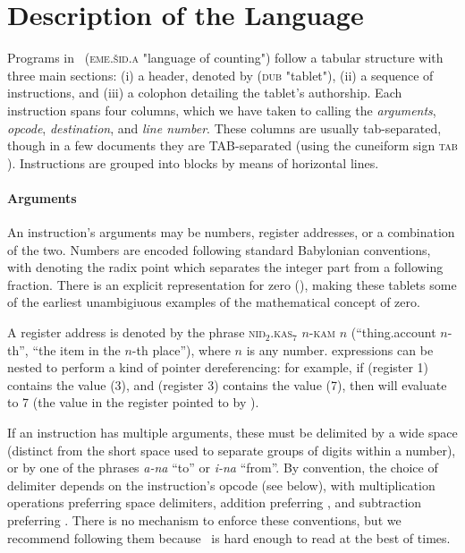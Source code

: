 \documentclass[11pt]{article}
\newcommand{\emeszida}{\textcuneiform{𒅴𒋃𒀀}}
\begin{document}
\section{Description of the Language}
Programs in \emeszida\ (\textsc{eme.šid.a} "language of counting") follow a tabular structure with three main sections: (i) a header, denoted by  (\textsc{dub}  "tablet"), (ii) a sequence of instructions, and (iii) a colophon detailing the tablet's authorship.
Each instruction spans four columns, which we have taken to calling the \textit{arguments}, \textit{opcode}, \textit{destination}, and \textit{line number}. 
These columns are usually tab-separated, though in a few documents they are TAB-separated (using the cuneiform sign \textsc{tab} ).
Instructions are grouped into blocks by means of horizontal lines.

\paragraph{Arguments}
An instruction's arguments may be numbers, register addresses, or a combination of the two. Numbers are encoded following standard Babylonian conventions, with  denoting the radix point which separates the integer part from a following fraction. There is an explicit representation for zero (), making these tablets some of the earliest unambigiuous examples of the mathematical concept of zero.

A register address is denoted by the phrase \textsc{niŋ$_2$.kas$_7$} $n$-\textsc{kam} $n$ (``thing.account $n$-th'', ``the item in the $n$-th place''), where $n$ is any number.  expressions can be nested to perform a kind of pointer dereferencing: for example, if  (register 1) contains the value  (3), and  (register 3) contains the value  (7), then  will evaluate to 7 (the value in the register pointed to by ).

If an instruction has multiple arguments, these must be delimited by a wide space (distinct from the short space used to separate groups of digits within a number), or by one of the phrases \textit{a-na}  ``to'' or \textit{i-na}  ``from''. By convention, the choice of delimiter depends on the instruction's opcode (see below), with multiplication operations preferring space delimiters, addition preferring , and subtraction preferring . 
There is no mechanism to enforce these conventions, but we recommend following them because \emeszida\ is hard enough to read at the best of times.
\end{document}
